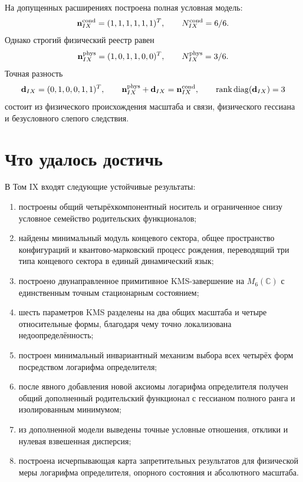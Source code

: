 На допущенных расширениях построена полная условная модель:
\begin{equation}
 \mathbf n_{IX}^{\rm cond}=(1,1,1,1,1,1)^T,
 \qquad N_{IX}^{\rm cond}=6/6.
 \label{eq:v9-final-conditional-status}
\end{equation}
Однако строгий физический реестр равен
\begin{equation}
 \mathbf n_{IX}^{\rm phys}=(1,0,1,1,0,0)^T,
 \qquad N_{IX}^{\rm phys}=3/6.
 \label{eq:v9-final-physical-status}
\end{equation}
Точная разность
\begin{equation}
 \mathbf d_{IX}=(0,1,0,0,1,1)^T,
 \qquad
 \mathbf n_{IX}^{\rm phys}+\mathbf d_{IX}=\mathbf n_{IX}^{\rm cond},
 \qquad \operatorname{rank}\operatorname{diag}(\mathbf d_{IX})=3
 \label{eq:v9-final-status-decomposition}
\end{equation}
состоит из физического происхождения масштаба и связи, физического гессиана
и безусловного слепого следствия.

\section{Что удалось достичь}

В Том IX входят следующие устойчивые результаты:
\begin{enumerate}
\item построены общий четырёхкомпонентный носитель и ограниченное снизу
условное семейство родительских функционалов;
\item найдены минимальный модуль концевого сектора, общее пространство
конфигураций и квантово-марковский процесс рождения, переводящий три типа
концевого сектора в единый динамический язык;
\item построено двунаправленное примитивное KMS-завершение на $M_6(\mathbb C)$
с единственным точным стационарным состоянием;
\item шесть параметров KMS разделены на два общих масштаба и четыре
относительные формы, благодаря чему точно локализована недоопределённость;
\item построен минимальный инвариантный механизм выбора всех четырёх форм
посредством логарифма определителя;
\item после явного добавления новой аксиомы логарифма определителя получен
общий дополненный родительский функционал с гессианом полного ранга и
изолированным минимумом;
\item из дополненной модели выведены точные условные отношения, отклики и
нулевая взвешенная дисперсия;
\item построена исчерпывающая карта запретительных результатов для физической
меры логарифма определителя, опорного состояния и абсолютного масштаба.
\end{enumerate}

